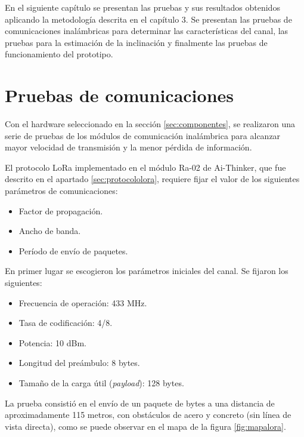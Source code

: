 
En el siguiente capítulo se presentan las pruebas y sus resultados obtenidos aplicando la metodología descrita en el capítulo 3. Se presentan las pruebas de comunicaciones inalámbricas para determinar las características del canal, las pruebas para la estimación de la inclinación y finalmente las pruebas de funcionamiento del prototipo.

\section{Pruebas de comunicaciones}

Con el hardware seleccionado en la sección \ref{sec:componentes}, se realizaron una serie de pruebas de los módulos de comunicación inalámbrica para alcanzar mayor velocidad de transmisión y la menor pérdida de información.

El protocolo LoRa implementado en el módulo Ra-02 de Ai-Thinker, que fue descrito en el apartado \ref{sec:protocololora}, requiere fijar el valor de los siguientes parámetros de comunicaciones:

\begin{itemize}
    \item Factor de propagación.
    \item Ancho de banda.
    \item Período de envío de paquetes.
\end{itemize}

En primer lugar se escogieron los parámetros iniciales del canal. Se fijaron los siguientes:

\begin{itemize}
    \item Frecuencia de operación: 433 MHz.
    \item Tasa de codificación: 4/8.
    \item Potencia: 10 dBm.
    \item Longitud del preámbulo: 8 bytes.
    \item Tamaño de la carga útil (\textit{payload}): 128 bytes.
\end{itemize}

La prueba consistió en el envío de un paquete de bytes a una distancia de aproximadamente 115 metros, con obstáculos de acero y concreto (sin línea de vista directa), como se puede observar en el mapa de la figura \ref{fig:mapalora}.

